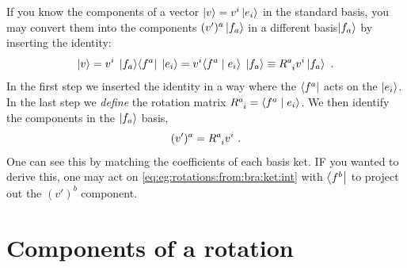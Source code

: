 \documentclass[12pt, oneside]{report}    %
\let\oldsection\section
\def\section{%
  \setcounter{sidenote}{1}%
  \oldsection
}
\begin{document}
\begin{example}\label{eg:rotations:from:bra:ket}
If you know the components of a vector $\left|v\right\rangle = v^i \left|e_i\right\rangle$ in the standard basis, you may convert them into the components $(v')^a \left|f_a\right\rangle$ in a different basis\sidenotemark $\left|f_a\right\rangle$ by inserting the identity:
\begin{align}
    \ket{v} = v^i\; \ket{f_a}\!\bra{f^a} \; \ket{e_i}
    = v^i \la f^a \mid e_i \ra \; \ket{f_a}
    \equiv R\aij{a}{i}v^i \ket{f_a} \ .
    \label{eq:eg:rotations:from:bra:ket:int}
\end{align}
In the first step we inserted the identity in a way where the $\left\langle f^a\right|$ acts on the $\left|e_i\right\rangle$. In the last step we \emph{define} the rotation matrix $R\aij{a}{i} = \la f^a \mid e_i \ra$. We then identify the components in the $\left|f_a\right\rangle$ basis,
\begin{align}
    (v')^a = R\aij{a}{i}v^i \ .
\end{align}
One can see this by matching the coefficients of each basis ket. IF you wanted to derive this, one may act on \eqref{eq:eg:rotations:from:bra:ket:int} with $\left\langle f^b\right|$ to project out the $(v')^b$ component.
\end{example}

\section{Components of a rotation}
\end{document}
